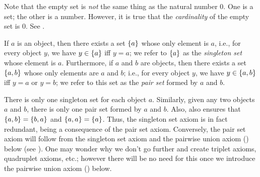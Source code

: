 \begin{rmk}\label{i:3.1.8}
  Note that the empty set is \emph{not} the same thing as the natural number \(0\).
  One is a set;
  the other is a number.
  However, it is true that the \emph{cardinality} of the empty set is \(0\).
  See .
\end{rmk}

\begin{ax}\label{i:3.3}
  If \(a\) is an object, then there exists a set \(\left\lbrace a\right\rbrace\) whose only element is \(a\), i.e., for every object \(y\), we have \(y \in \left\lbrace a\right\rbrace\) iff \(y = a\);
  we refer to \(\left\lbrace a\right\rbrace\) as the \emph{singleton set} whose element is \(a\).
  Furthermore, if \(a\) and \(b\) are objects, then there exists a set \(\left\lbrace a, b\right\rbrace\) whose only elements are \(a\) and \(b\);
  i.e., for every object \(y\), we have \(y \in \left\lbrace a, b\right\rbrace\) iff \(y = a\) or \(y = b\);
  we refer to this set as the \emph{pair set} formed by \(a\) and \(b\).
\end{ax}

\begin{rmk}\label{i:3.1.9}
  There is only one singleton set for each object \(a\).
  Similarly, given any two objects \(a\) and \(b\), there is only one pair set formed by \(a\) and \(b\).
  Also,  also ensures that \(\left\lbrace a, b\right\rbrace = \left\lbrace b, a\right\rbrace\) and \(\left\lbrace a, a\right\rbrace = \left\lbrace a\right\rbrace\).
  Thus, the singleton set axiom is in fact redundant, being a consequence of the pair set axiom.
  Conversely, the pair set axiom will follow from the singleton set axiom and the pairwise union axiom () below (see ).
  One may wonder why we don't go further and create triplet axioms, quadruplet axioms, etc.;
  however there will be no need for this once we introduce the pairwise union axiom () below.
\end{rmk}

